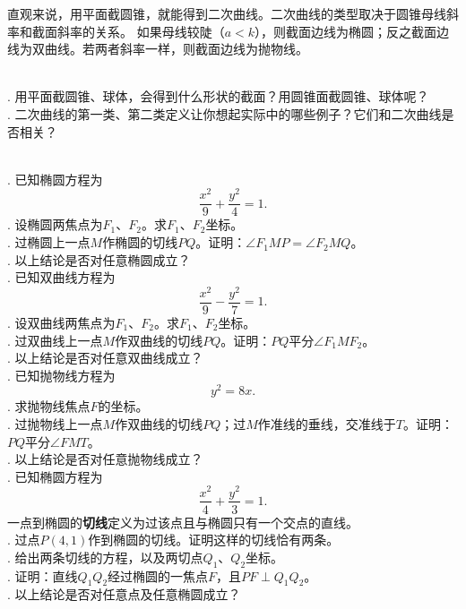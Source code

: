 \documentclass[12pt,UTF8]{ctexbook}
\begin{document}

直观来说，用平面截圆锥，就能得到二次曲线。二次曲线的类型取决于圆锥母线斜率和截面斜率的关系。
如果母线较陡（$a<k$），则截面边线为椭圆；反之截面边线为双曲线。若两者斜率一样，则截面边线为抛物线。

\begin{sk}
    \mbox{} \\
    . 用平面截圆锥、球体，会得到什么形状的截面？用圆锥面截圆锥、球体呢？\\
    . 二次曲线的第一类、第二类定义让你想起实际中的哪些例子？它们和二次曲线是否相关？
\end{sk}

\begin{xt}
    \mbox{} \\
    . 已知椭圆方程为
    $$ \frac{x^2}{9} + \frac{y^2}{4} = 1.$$
    . 设椭圆两焦点为$F_1$、$F_2$。求$F_1$、$F_2$坐标。\\
    . 过椭圆上一点$M$作椭圆的切线$PQ$。证明：$\angle F_1MP = \angle F_2MQ$。\\
    . 以上结论是否对任意椭圆成立？\\
    . 已知双曲线方程为
    $$ \frac{x^2}{9} - \frac{y^2}{7} = 1.$$
    . 设双曲线两焦点为$F_1$、$F_2$。求$F_1$、$F_2$坐标。\\
    . 过双曲线上一点$M$作双曲线的切线$PQ$。证明：$PQ$平分$\angle F_1MF_2$。\\
    . 以上结论是否对任意双曲线成立？\\
    . 已知抛物线方程为
    $$ y^2 = 8x.$$
    . 求抛物线焦点$F$的坐标。\\
    . 过抛物线上一点$M$作双曲线的切线$PQ$；过$M$作准线的垂线，交准线于$T$。证明：$PQ$平分$\angle FMT$。\\
    . 以上结论是否对任意抛物线成立？\\
    . 已知椭圆方程为
    $$ \frac{x^2}{4} + \frac{y^2}{3} = 1.$$
    一点到椭圆的\textbf{切线}定义为过该点且与椭圆只有一个交点的直线。\\
    . 过点$P(4, 1)$作到椭圆的切线。证明这样的切线恰有两条。\\
    . 给出两条切线的方程，以及两切点$Q_1$、$Q_2$坐标。\\
    . 证明：直线$Q_1Q_2$经过椭圆的一焦点$F$，且$PF\perp Q_1Q_2$。\\
    . 以上结论是否对任意点及任意椭圆成立？\\

\end{xt}
\end{document}
